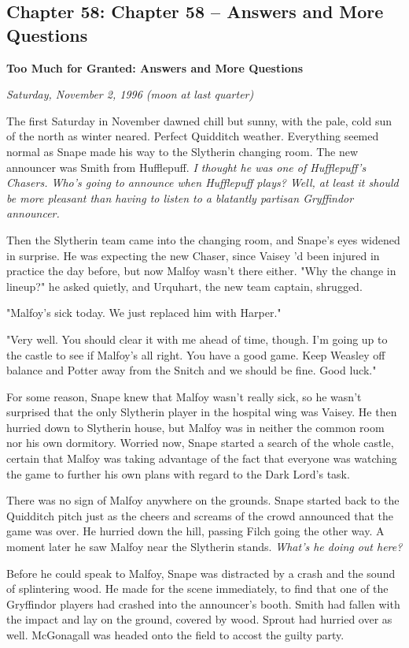 \documentclass[a4paper,11pt]{article}
\begin{document}
\subsection{Chapter 58: Chapter 58 – Answers and More Questions}

\textbf{Too Much for Granted: Answers and More Questions}

\emph{Saturday, November 2, 1996 (moon at last quarter)}

The first Saturday in November dawned chill but sunny, with the pale, cold sun of the north as winter neared. Perfect Quidditch weather. Everything seemed normal as Snape made his way to the Slytherin changing room. The new announcer was Smith from Hufflepuff. \emph{I thought he was one of Hufflepuff's Chasers. Who's going to announce when Hufflepuff plays? Well, at least it should be more pleasant than having to listen to a blatantly partisan Gryffindor announcer.}

Then the Slytherin team came into the changing room, and Snape's eyes widened in surprise. He was expecting the new Chaser, since Vaisey 'd been injured in practice the day before, but now Malfoy wasn't there either. "Why the change in lineup?" he asked quietly, and Urquhart, the new team captain, shrugged.

"Malfoy's sick today. We just replaced him with Harper."

"Very well. You should clear it with me ahead of time, though. I'm going up to the castle to see if Malfoy's all right. You have a good game. Keep Weasley off balance and Potter away from the Snitch and we should be fine. Good luck."

For some reason, Snape knew that Malfoy wasn't really sick, so he wasn't surprised that the only Slytherin player in the hospital wing was Vaisey. He then hurried down to Slytherin house, but Malfoy was in neither the common room nor his own dormitory. Worried now, Snape started a search of the whole castle, certain that Malfoy was taking advantage of the fact that everyone was watching the game to further his own plans with regard to the Dark Lord's task.

There was no sign of Malfoy anywhere on the grounds. Snape started back to the Quidditch pitch just as the cheers and screams of the crowd announced that the game was over. He hurried down the hill, passing Filch going the other way. A moment later he saw Malfoy near the Slytherin stands. \emph{What's he doing out here?}

Before he could speak to Malfoy, Snape was distracted by a crash and the sound of splintering wood. He made for the scene immediately, to find that one of the Gryffindor players had crashed into the announcer's booth. Smith had fallen with the impact and lay on the ground, covered by wood. Sprout had hurried over as well. McGonagall was headed onto the field to accost the guilty party.
\end{document}
